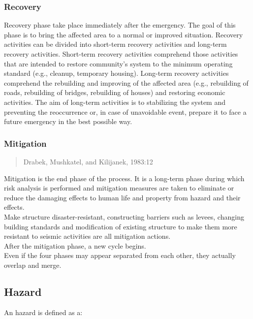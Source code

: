 \subsubsection{Recovery}
Recovery phase take place immediately after the emergency. The goal of this phase is to bring the affected area to a normal or improved situation. Recovery activities can be divided into short-term recovery activities and long-term recovery activities. Short-term recovery activities comprehend those activities that are intended to restore community's system to the minimum operating standard (e.g., cleanup, temporary housing). Long-term recovery activities comprehend the rebuilding and improving of the affected area (e.g., rebuilding of roads, rebuilding of bridges, rebuilding of houses) and restoring economic activities. The aim of long-term activities is to stabilizing the system and preventing the reoccurrence or, in case of unavoidable event, prepare it to face a future emergency in the best possible way.

\newpage
\subsubsection{Mitigation}
\begin{quotation}
{\footnotesize
{}
\begin{flushright}
Drabek, Mushkatel, and Kilijanek, 1983:12
\end{flushright}
}
\end{quotation}
Mitigation is the end phase of the process. It is a long-term phase during which risk analysis is performed and mitigation measures are taken to eliminate or reduce the damaging effects to human life and property from hazard and their effects. 
\\
\noindent Make structure disaster-resistant, constructing barriers such as levees, changing building standards and modification of existing structure to make them more resistant to seismic activities are all mitigation actions.
\vspace*{0.3cm}
\\
After the mitigation phase, a new cycle begins. 
\\
Even if the four phases may appear separated from each other, they actually overlap and merge.

\newpage
\subsection{Hazard}
An hazard is defined as a:

